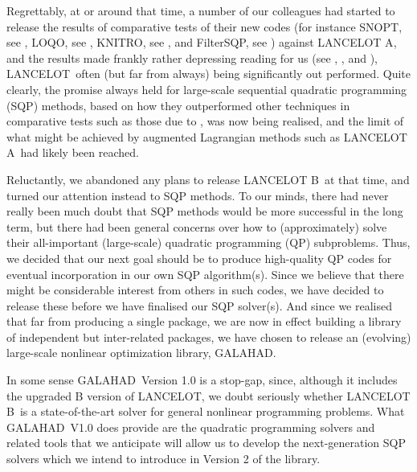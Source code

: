 \documentclass[twoside]{article}
\newcommand{\gal}{{\sf GALAHAD}}
\newcommand{\lan}{{\sf LANCELOT}}
\newcommand{\lana}{{\sf LANCELOT A}}
\newcommand{\lanb}{{\sf LANCELOT B}}
\begin{document}
Regrettably, at or around that time, a number of our colleagues 
had started to release the results of comparative tests of their
new codes (for instance SNOPT, see ,
LOQO, see , 
KNITRO, see , and
FilterSQP, see ) against \lana,
and the results made frankly rather depressing reading for us
(see , , and ), \lan\
often (but far from always) being significantly out performed. 
Quite clearly, the promise always held for large-scale 
sequential quadratic programming (SQP) methods,
based on how they outperformed other techniques in comparative tests
such as those due to \cite{HockSchi81}, was now being realised, and the 
limit of what might be achieved by augmented Lagrangian methods
such as \lana\ had likely been reached.

Reluctantly, we abandoned any plans to release \lanb\ at that time, and turned
our attention instead to SQP methods. To our minds, there had never
really been much doubt that SQP methods would be more successful in the
long term, but there had been  general concerns over 
how to (approximately) solve their all-important (large-scale) quadratic 
programming (QP) subproblems. Thus, we decided that our next goal
should be to produce high-quality QP codes for eventual incorporation 
in our own SQP algorithm(s). Since we believe that there might
be considerable interest from others in such codes, we have decided to release
these before we have finalised our SQP solver(s). And since we realised that
far from producing a single package, we are now in effect building a 
library of independent but inter-related packages, we have chosen to
release an (evolving) large-scale nonlinear optimization library, \gal.

In some sense \gal\ Version 1.0 is a stop-gap, since, although
it includes the upgraded B version of \lan, we doubt seriously whether 
\lanb\ is a state-of-the-art solver for general nonlinear programming
problems. What \gal\ V1.0 does provide are the quadratic programming solvers
and related tools that we anticipate will allow us to develop the 
next-generation SQP solvers 
which we intend to introduce in Version 2 of the library.


\end{document}

